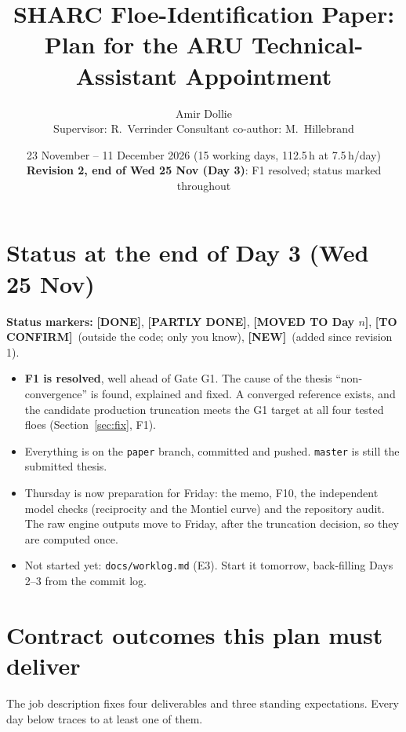 \documentclass[10pt,a4paper]{article}
\title{\color{ocean}\textbf{SHARC Floe-Identification Paper:\\Plan for the ARU Technical-Assistant Appointment}}
\author{Amir Dollie\\\small Supervisor: R.\ Verrinder \quad Consultant co-author: M.\ Hillebrand}
\date{\small 23 November -- 11 December 2026 \quad (15 working days, 112.5\,h at 7.5\,h/day)\\
\textbf{Revision 2, end of Wed 25 Nov (Day 3)}: F1 resolved; status marked throughout}
\newcommand{\DONE}{\textcolor{done}{\textbf{[DONE]}}}
\newcommand{\PART}{\textcolor{part}{\textbf{[PARTLY DONE]}}}
\newcommand{\MOVED}[1]{\textcolor{moved}{\textbf{[MOVED TO #1]}}}
\newcommand{\CONFIRM}{\textcolor{part}{\textbf{[TO CONFIRM]}}}
\newcommand{\NEW}{\textcolor{ocean}{\textbf{[NEW]}}}
\begin{document}
\maketitle
\vspace{-1em}

\section*{Status at the end of Day 3 (Wed 25 Nov)}
\textbf{Status markers:} \DONE, \PART, \MOVED{Day $n$}, \CONFIRM\ (outside the code; only you know), \NEW\ (added since revision 1).

\begin{itemize}
\item \textbf{F1 is resolved}, well ahead of Gate G1. The cause of the thesis ``non-convergence'' is found, explained and fixed. A converged reference exists, and the candidate production truncation meets the G1 target at all four tested floes (Section~\ref{sec:fix}, F1).
\item Everything is on the \texttt{paper} branch, committed and pushed. \texttt{master} is still the submitted thesis.
\item Thursday is now preparation for Friday: the memo, F10, the independent model checks (reciprocity and the Montiel curve) and the repository audit. The raw engine outputs move to Friday, after the truncation decision, so they are computed once.
\item Not started yet: \texttt{docs/worklog.md} (E3). Start it tomorrow, back-filling Days 2--3 from the commit log.
\end{itemize}

\section{Contract outcomes this plan must deliver}
The job description fixes four deliverables and three standing expectations. Every day below traces to at least one of them.
\end{document}
